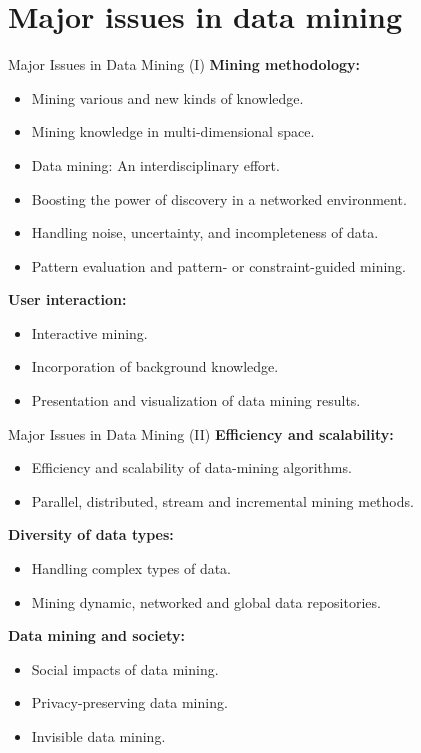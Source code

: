 \section{Major issues in data mining}

\begin{frame}{Major Issues in Data Mining (I)}
	\textbf{Mining methodology:}\\
	\begin{itemize}
		\item Mining various and new kinds of knowledge.
		\item Mining knowledge in multi-dimensional space.
		\item Data mining: An interdisciplinary effort.
		\item Boosting the power of discovery in a networked environment.
		\item Handling noise, uncertainty, and incompleteness of data.
		\item Pattern evaluation and pattern- or constraint-guided mining.
	\end{itemize}
	\textbf{User interaction:}\\
	\begin{itemize}
		\item Interactive mining.
		\item Incorporation of background knowledge.
		\item Presentation and visualization of data mining results.
	\end{itemize}
\end{frame}

\begin{frame}{Major Issues in Data Mining (II)}
	\textbf{Efficiency and scalability:}\\
	\begin{itemize}
		\item Efficiency and scalability of data-mining algorithms.
		\item Parallel, distributed, stream and incremental mining methods.
	\end{itemize}
	\textbf{Diversity of data types:}\\
	\begin{itemize}
		\item Handling complex types of data.
		\item Mining dynamic, networked and global data repositories.
	\end{itemize}
	\textbf{Data mining and society:}\\
	\begin{itemize}
		\item Social impacts of data mining.
		\item Privacy-preserving data mining.
		\item Invisible data mining.
	\end{itemize}
\end{frame}